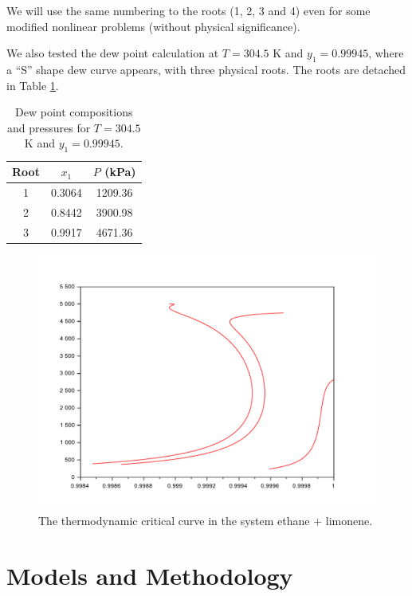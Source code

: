 \documentclass{article}
\theoremstyle{definition}
\theoremstyle{remark}
\begin{document}
We will use the same numbering to the roots (1, 2, 3 and 4) even for some modified nonlinear problems (without physical significance).

We also tested the dew point calculation at $T = 304.5$ K and $y_1 = 0.99945$, where a ``S'' shape dew curve appears, with three physical roots. The roots are detached in Table \ref{tab:roots_S}.

\begin{table}[http!]
	\begin{center}
	\begin{tabular}{ccc} \hline \small
Root & $x_1$ & $P$ (kPa) \\
\hline
1 & 0.3064 & 1209.36 \\
2 & 0.8442 & 3900.98 \\
3 & 0.9917 & 4671.36 \\
	\hline
	\end{tabular}
	\caption{ {\small Dew point compositions and pressures for $T = 304.5$ K and $y_1 = 0.99945$.}}\label{tab:roots_S}
	\end{center}
\end{table}

\begin{figure}
	\begin{center}
		\includegraphics[scale=0.50]{curvas.pdf}
		\caption{The thermodynamic critical curve in the system ethane + limonene.}\label{fig:critical_thermo}
	\end{center}
\end{figure}


\section{Models and Methodology}
\end{document}
